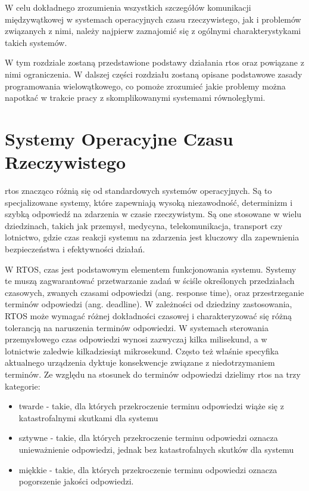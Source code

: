 W celu dokładnego zrozumienia wszystkich szczegółów komunikacji międzywątkowej w systemach operacyjnych czasu rzeczywistego,
jak i problemów związanych z nimi, należy najpierw zaznajomić się z ogólnymi
charakterystykami takich systemów.

W tym rozdziale zostaną przedstawione podstawy działania \gls{rtos}
oraz powiązane z nimi ograniczenia. W dalszej części rozdziału zostaną opisane podstawowe zasady
programowania wielowątkowego, co pomoże zrozumieć jakie problemy można napotkać w trakcie
pracy z skomplikowanymi systemami równoległymi.

\section{Systemy Operacyjne Czasu Rzeczywistego}
\Gls{rtos} znacząco różnią się od standardowych systemów operacyjnych. Są to specjalizowane systemy, które zapewniają wysoką niezawodność,
determinizm i szybką odpowiedź na zdarzenia w czasie rzeczywistym.
Są one stosowane w wielu dziedzinach, takich jak przemysł, medycyna, telekomunikacja, transport czy lotnictwo,
gdzie czas reakcji systemu na zdarzenia jest kluczowy dla zapewnienia bezpieczeństwa i efektywności działań.

W RTOS, czas jest podstawowym elementem funkcjonowania systemu\cite{design_and_analysis_phillip_a_laplante}.
Systemy te muszą zagwarantować przetwarzanie zadań w ściśle określonych przedziałach czasowych,
zwanych czasami odpowiedzi (ang. response time), oraz przestrzeganie terminów odpowiedzi (ang. deadline).
W zależności od dziedziny zastosowania, RTOS może wymagać różnej dokładności czasowej i charakteryzować się różną tolerancją na naruszenia terminów odpowiedzi.
W systemach sterowania przemysłowego czas odpowiedzi wynosi zazwyczaj kilka milisekund, a w lotnictwie zaledwie kilkadziesiąt mikrosekund. Często też właśnie specyfika aktualnego urządzenia dyktuje konsekwencje związane z niedotrzymaniem terminów.
Ze względu na stosunek do terminów odpowiedzi dzielimy \gls{rtos} na trzy kategorie\cite{real-time_computing_Shin, design_and_analysis_phillip_a_laplante}:
\begin{itemize}
      \item twarde - takie, dla których przekroczenie terminu odpowiedzi wiąże się z katastrofalnymi skutkami dla systemu
      \item sztywne - takie, dla których przekroczenie terminu odpowiedzi oznacza unieważnienie odpowiedzi, jednak bez katastrofalnych skutków dla systemu
      \item miękkie - takie, dla których przekroczenie terminu odpowiedzi oznacza pogorszenie jakości odpowiedzi.
\end{itemize}

